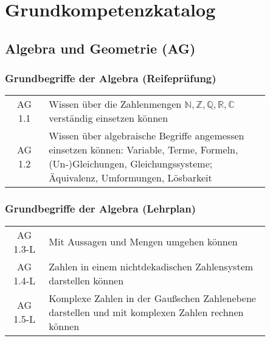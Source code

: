 \documentclass[a4paper,12pt]{article}
\begin{document}
\section{Grundkompetenzkatalog} 

\subsection{Algebra und Geometrie (AG)}

\subsubsection{Grundbegriffe der Algebra (Reifeprüfung)}

\begin{tabular}{cp{0.85\linewidth}}
AG 1.1& Wissen über die Zahlenmengen $\mathbb{N}, \mathbb{Z}, \mathbb{Q}, \mathbb{R}, \mathbb{C}$ verständig einsetzen können \\

AG 1.2 &Wissen über algebraische Begriffe angemessen einsetzen können: Variable, Terme, Formeln, (Un-)Gleichungen, Gleichungssysteme; Äquivalenz, Umformungen, Lösbarkeit\\
\end{tabular}

%



\subsubsection{Grundbegriffe der Algebra (Lehrplan)}
\begin{em}
\begin{tabular}{cp{0.85\linewidth}}
AG 1.3-L & Mit Aussagen und Mengen umgehen können \\

AG 1.4-L & Zahlen in einem nichtdekadischen Zahlensystem darstellen können \\

AG 1.5-L & Komplexe Zahlen in der Gaußschen Zahlenebene darstellen und mit komplexen Zahlen rechnen können \\
\end{tabular}
\end{em}
\end{document}
